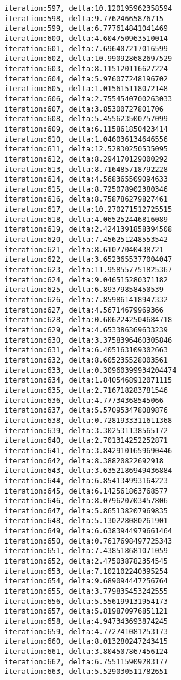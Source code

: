 \documentclass[11pt]{article}
\begin{document}
\begin{Verbatim}[commandchars=\\\{\}]
iteration:597, delta:10.120195962358594
iteration:598, delta:9.77624665876715
iteration:599, delta:6.777614841041469
iteration:600, delta:4.604750963510014
iteration:601, delta:7.696407217016599
iteration:602, delta:10.990928682697529
iteration:603, delta:8.115120116627224
iteration:604, delta:5.976077248196702
iteration:605, delta:1.015615118072148
iteration:606, delta:2.7554540700263033
iteration:607, delta:3.85300727801706
iteration:608, delta:5.455623500757099
iteration:609, delta:6.115861850423414
iteration:610, delta:1.046036134646556
iteration:611, delta:12.52830250535095
iteration:612, delta:8.294170129000292
iteration:613, delta:8.716485718792228
iteration:614, delta:4.568365509094633
iteration:615, delta:8.725078902380346
iteration:616, delta:8.758786279827461
iteration:617, delta:10.270271512725515
iteration:618, delta:4.065252446816089
iteration:619, delta:2.4241391858394508
iteration:620, delta:7.456251248553542
iteration:621, delta:8.61077040438721
iteration:622, delta:3.6523655377004047
iteration:623, delta:11.958557751825367
iteration:624, delta:9.046515280371182
iteration:625, delta:6.89379858450539
iteration:626, delta:7.859861418947332
iteration:627, delta:4.56714679969366
iteration:628, delta:0.6062242504684718
iteration:629, delta:4.653386369633239
iteration:630, delta:3.3758396460305846
iteration:631, delta:6.405163109302663
iteration:632, delta:8.605235528003561
iteration:633, delta:0.30960399934204474
iteration:634, delta:1.8405468912071115
iteration:635, delta:2.716718283781546
iteration:636, delta:4.77734368545066
iteration:637, delta:5.570953478089876
iteration:638, delta:0.7281933311611368
iteration:639, delta:3.302531138565172
iteration:640, delta:2.701314252252871
iteration:641, delta:3.8429101659690446
iteration:642, delta:8.38820822692918
iteration:643, delta:3.6352186949436884
iteration:644, delta:6.854134993164223
iteration:645, delta:6.142561863768577
iteration:646, delta:8.079620703457806
iteration:647, delta:5.865138207969835
iteration:648, delta:5.130228080261901
iteration:649, delta:6.6383944979661464
iteration:650, delta:0.7617698497725343
iteration:651, delta:7.438518681071059
iteration:652, delta:2.475038782354545
iteration:653, delta:7.102102240395254
iteration:654, delta:9.689094447256764
iteration:655, delta:3.779835453242555
iteration:656, delta:5.556199131954173
iteration:657, delta:5.819870976851121
iteration:658, delta:4.947343693874245
iteration:659, delta:4.772741081253173
iteration:660, delta:8.013280247243415
iteration:661, delta:3.804507867456124
iteration:662, delta:6.755115909283177
iteration:663, delta:5.529030511782651

\end{Verbatim}
\end{document}
